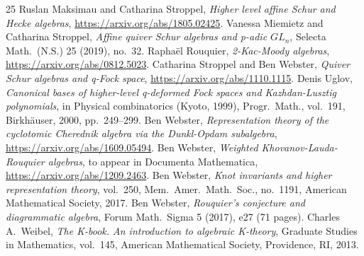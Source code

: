 \begin{thebibliography}{25}
 Ruslan Maksimau and Catharina Stroppel, \emph{Higher level affine Schur and Hecke algebras}, \url{https://arxiv.org/abs/1805.02425}.
 Vanessa Miemietz and Catharina Stroppel, \emph{Affine quiver Schur algebras and p-adic $GL_n$}, Selecta Math.\ (N.S.) 25 (2019), no.~32.
 Rapha\"el Rouquier, \emph{2-Kac-Moody algebras}, \url{https://arxiv.org/abs/0812.5023}.
 Catharina Stroppel and Ben Webster, \emph{Quiver Schur algebras and q-Fock space}, \url{https://arxiv.org/abs/1110.1115}.
 Denis Uglov, \emph{Canonical bases of higher-level q-deformed Fock spaces and Kazhdan-Lusztig polynomials}, in Physical combinatorics (Kyoto, 1999), Progr.\ Math., vol.~191, Birkh\"auser, 2000, pp.~249--299.
 Ben Webster, \emph{Representation theory of the cyclotomic Cherednik algebra via the Dunkl-Opdam subalgebra}, \url{https://arxiv.org/abs/1609.05494}.
 Ben Webster, \emph{Weighted Khovanov-Lauda-Rouquier algebras}, to appear in Documenta Mathematica, \url{https://arxiv.org/abs/1209.2463}.
 Ben Webster, \emph{Knot invariants and higher representation theory}, vol.~250, Mem.\ Amer.\ Math.\ Soc., no.~1191, American Mathematical Society, 2017.
 Ben Webster, \emph{Rouquier's conjecture and diagrammatic algebra}, Forum Math.\ Sigma 5 (2017), e27 (71 pages).
 Charles A.~Weibel, \emph{The K-book. An introduction to algebraic K-theory}, Graduate Studies in Mathematics, vol.~145, American Mathematical Society, Providence, RI, 2013.
\end{thebibliography}
